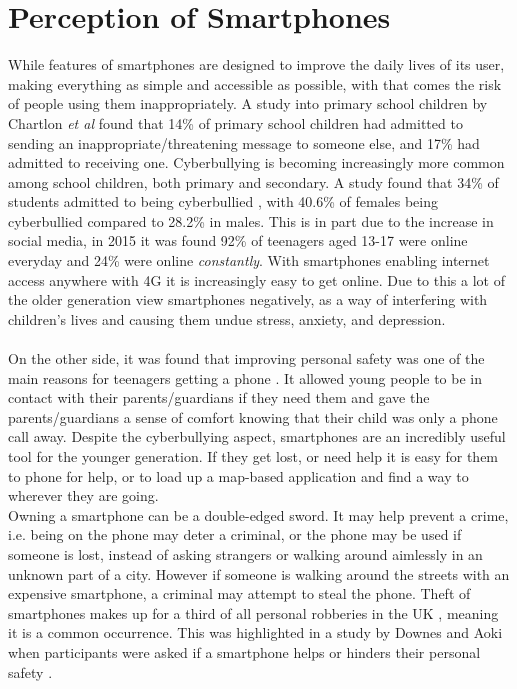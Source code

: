\documentclass[a4paper]{report}
\begin{document}
\section{Perception of Smartphones}
\label{sec:Smartphones}
While features of smartphones are designed to improve the daily lives of its user, making everything as simple and accessible as possible, with that comes the risk of people using them inappropriately. A study into primary school children by Chartlon \textit{et al} \cite{charlton} found that
14\% of primary school children had admitted to sending an inappropriate/threatening message to someone else, and 17\% had admitted to receiving one. Cyberbullying is becoming increasingly more common among school children, both primary and secondary. A study found that 34\% of students admitted to being
cyberbullied \cite{cyberbullying}, with 40.6\% of females being cyberbullied compared to 28.2\% in males. This is in part due to the increase in social media, in 2015 it was found 92\% of teenagers aged 13-17 were online everyday and 24\% were online \textit{constantly}. With smartphones enabling internet access
anywhere with 4G it is increasingly easy to get online. Due to this a lot of the older generation view smartphones negatively, as a way of interfering with children's lives and causing them undue stress, anxiety, and depression.
\\ \\ On the other side, it was found that improving personal safety was one of the main reasons for teenagers getting a phone \cite{downes}. It allowed young people to be in contact with their parents/guardians if they need them and gave the parents/guardians a sense of comfort
knowing that their child was only a phone call away. Despite the cyberbullying aspect, smartphones are an incredibly useful tool for the younger generation. If they get lost, or need help it is easy for them to phone for help, or to load up a map-based application and find a way to wherever they are going.
\\ Owning a smartphone can be a double-edged sword. It may help prevent a crime, i.e. being on the phone may deter a criminal, or the phone may be used if someone is lost, instead of asking strangers or walking around aimlessly in an unknown part of a city. However if someone is walking around the streets with
an expensive smartphone, a criminal may attempt to steal the phone. Theft of smartphones makes up for a third of all personal robberies in the UK \cite{tennakoon}, meaning it is a common occurrence.
 This was highlighted in a study by Downes and Aoki when participants were asked if a smartphone helps or hinders their personal safety \cite{downes}.
\end{document}
